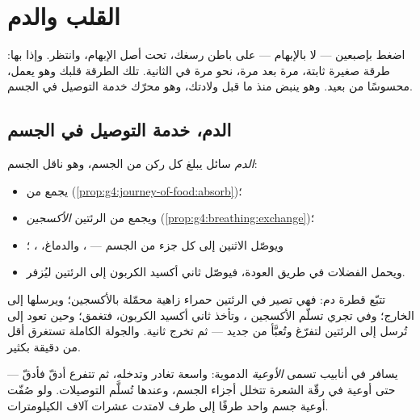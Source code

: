 \chapter{القلب والدم}\label{ch:g4:heart-and-blood}

اضغط بإصبعين --- لا بالإبهام --- على باطن رسغك، تحت أصل الإبهام،
وانتظر. وإذا بها: طرقة صغيرة ثابتة، مرة بعد مرة، نحو مرة في
الثانية. تلك الطرقة قلبك وهو يعمل، محسوسًا من بعيد. وهو ينبض منذ ما
قبل ولادتك، وهو محرّك خدمة التوصيل في الجسم.

\section{الدم، خدمة التوصيل في الجسم}

\begin{proposition}\label{prop:g4:heart-and-blood:carries}
\emph{الدم} سائل يبلغ كل ركن من الجسم، وهو ناقل الجسم:
\begin{itemize}
  \item يجمع من  \emph{}
        (\cref{prop:g4:journey-of-food:absorb})؛
  \item ويجمع من الرئتين \emph{الأكسجين}
        (\cref{prop:g4:breathing:exchange})؛
  \item ويوصّل الاثنين إلى كل جزء من الجسم --- ، والدماغ،
        ، ؛
  \item ويحمل الفضلات في طريق العودة، فيوصّل ثاني أكسيد الكربون
        إلى الرئتين ليُزفر.
\end{itemize}
\end{proposition}
\admitted

\begin{example}\label{ex:g4:heart-and-blood:round}
تتبّع قطرة دم: فهي تصير في الرئتين حمراء زاهية محمّلة بالأكسجين؛
ويرسلها  إلى الخارج؛ وفي   تجري تسلّم الأكسجين
، وتأخذ ثاني أكسيد الكربون، فتغمق؛ وحين تعود إلى 
تُرسل إلى الرئتين لتفرّغ وتُعبَّأ من جديد --- ثم تخرج ثانية. والجولة
الكاملة تستغرق أقل من دقيقة بكثير.
\end{example}

\begin{definition}\label{def:g4:heart-and-blood:vessels}
يسافر  في أنابيب تسمى \emph{الأوعية}
الدموية: واسعة تغادر  وتدخله، ثم تتفرع أدقّ فأدقّ --- حتى
أوعية في رقّة الشعرة تتخلل أجزاء الجسم، وعندها تُسلَّم التوصيلات.
ولو صُفّت أوعية جسم واحد طرفًا إلى طرف لامتدت عشرات آلاف
الكيلومترات.
\end{definition}

